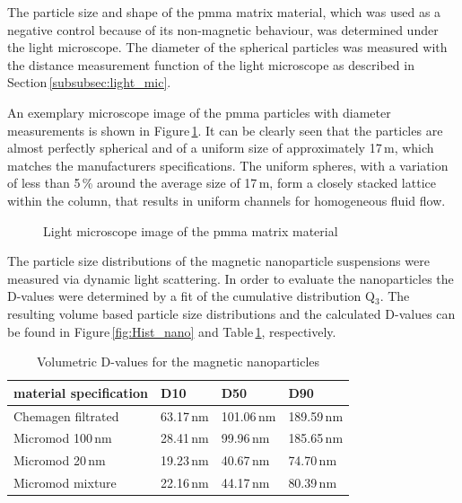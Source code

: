 The particle size and shape of the \gls{pmma} matrix material, which was used as a negative control because of its non-magnetic behaviour, was determined under the light microscope. The diameter of the spherical particles was measured with the distance measurement function of the light microscope as described in Section\,\ref{subsubsec:light_mic}.

An exemplary microscope image of the \gls{pmma} particles with diameter measurements is shown in Figure\,\ref{fig:PMMA}. It can be clearly seen that the particles are almost perfectly spherical and of a uniform size of approximately 17\,\textmu m, which matches the manufacturers specifications. The uniform spheres, with a variation of less than 5\,\% around the average size of 17\,\textmu m, form a closely stacked lattice within the column, that results in uniform channels for homogeneous fluid flow.

\begin{figure}[H]
\centering

\caption[Light microscope image of \gls{pmma}]{Light microscope image of the \gls{pmma} matrix material
\label{fig:PMMA}
}
\end{figure}

The particle size distributions of the magnetic nanoparticle suspensions were measured via dynamic light scattering. In order to evaluate the nanoparticles the D-values were determined by a fit of the cumulative distribution Q$_{3}$. The resulting volume based particle size distributions and the calculated D-values can be found in Figure\,\ref{fig:Hist_nano} and Table\,\ref{table:D_values}, respectively.

\begin{table}[h]
\centering
\caption[Volumetric D-values for the magnetic nanoparticles]{Volumetric D-values for the magnetic nanoparticles}
\label{table:D_values}
\begin{tabularx}{\textwidth}{XXXX}\hline
material specification & D10  & D50 & D90  \\
\hline\hline
Chemagen filtrated & 63.17\,nm & 101.06\,nm & 189.59\,nm \\
Micromod 100\,nm & 28.41\,nm & 99.96\,nm & 185.65\,nm \\
Micromod 20\,nm & 19.23\,nm & 40.67\,nm & 74.70\,nm \\
Micromod mixture & 22.16\,nm & 44.17\,nm & 80.39\,nm \\
\hline
\end{tabularx}
\end{table}  

